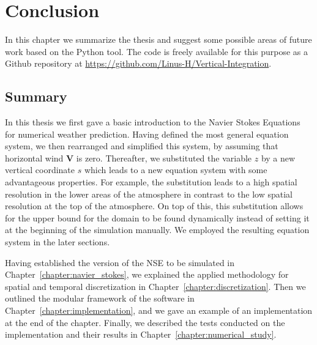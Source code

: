 
\chapter{Conclusion}\label{chapter:conclusion}
In this chapter we summarize the thesis and suggest some possible areas of future work based on the Python tool.
The code is freely available for this purpose as a Github repository at \url{https://github.com/Linus-H/Vertical-Integration}.

\section{Summary}
In this thesis we first gave a basic introduction to the Navier Stokes Equations for numerical weather prediction.
Having defined the most general equation system, we then rearranged and simplified this system, by assuming that horizontal wind $\textbf{V}$ is zero.
Thereafter, we substituted the variable $z$ by a new vertical coordinate $s$ which leads to a new equation system with some advantageous properties.
For example, the substitution leads to a high spatial resolution in the lower areas of the atmosphere in contrast to the low spatial resolution at the top of the atmosphere.
On top of this, this substitution allows for the upper bound for the domain to be found dynamically instead of setting it at the beginning of the simulation manually.
We employed the resulting equation system in the later sections.

Having established the version of the NSE to be simulated in Chapter~\ref{chapter:navier_stokes}, we explained the applied methodology for spatial and temporal discretization in Chapter~\ref{chapter:discretization}.
Then we outlined the modular framework of the software in Chapter~\ref{chapter:implementation}, and we gave an example of an implementation at the end of the chapter.
Finally, we described the tests conducted on the implementation and their results in Chapter~\ref{chapter:numerical_study}.


